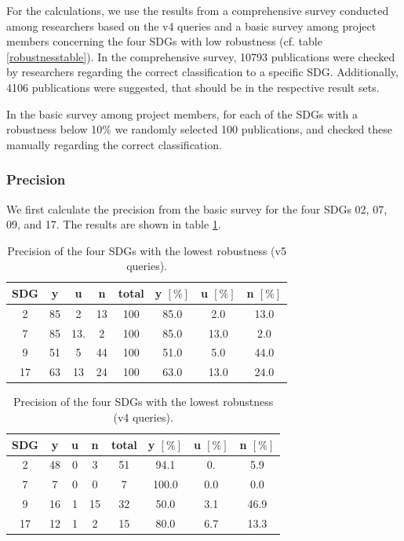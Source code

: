 \documentclass{article}
\begin{document}
For the calculations, we use the results from a comprehensive survey conducted among researchers based on the v4 queries \cite{vanderfeesten_survey_2020} and a basic survey among project members concerning the four SDGs with low robustness (cf. table \ref{robustnesstable}).
In the comprehensive survey, 10793 publications were checked by researchers regarding the correct classification to a specific SDG. Additionally, 4106 publications were suggested, that should be in the respective result sets.

In the basic survey among project members, for each of the SDGs with a robustness below 10\% we randomly selected 100 publications, and checked these manually regarding the correct classification.

\subsubsection{Precision}

We first calculate the precision from the basic survey for the four SDGs 02, 07, 09, and 17. The results are shown in table \ref{precisionv5surv}.

\begin{minipage}[H]{0.49\textwidth}
\begin{table}[H]
\centering 
 \begin{tabular}{cccccccc}
 \toprule
 SDG & y & u & n & total & y $[\%]$ & u $[\%]$ & n $[\%]$ \\
  \hline
2 & 85 & 2 & 13 & 100 & 85.0 & 2.0 & 13.0 \\
7 & 85 & 13. & 2 & 100 & 85.0 & 13.0 & 2.0 \\
9 & 51 & 5 & 44 & 100 & 51.0 & 5.0 & 44.0 \\
17 & 63 & 13 & 24 & 100 & 63.0& 13.0 & 24.0 \\
\bottomrule
\end{tabular}
\caption{Precision of the four SDGs with the lowest robustness (v5 queries).}\label{precisionv5surv}
\end{table}
\end{minipage}
\begin{minipage}[H]{0.01\textwidth}
\hfill
\end{minipage}
\begin{minipage}[H]{0.49\textwidth}
\begin{table}[H]
\centering 
 \begin{tabular}{cccccccc}
 \toprule
  SDG & y & u & n & total & y $[\%]$ & u $[\%]$ & n $[\%]$ \\
  \hline
2& 48 & 0 & 3 & 51 & 94.1 & 0. & 5.9 \\
7 & 7 & 0 & 0 & 7 & 100.0 & 0.0 & 0.0 \\
9 & 16 & 1 & 15 & 32 & 50.0 & 3.1 & 46.9 \\
17 & 12 & 1 & 2 & 15 & 80.0 & 6.7 & 13.3 \\
\bottomrule
\end{tabular}\caption{Precision of the four SDGs with the lowest robustness (v4 queries).}\label{precisionv4surv}
\end{table}
\end{minipage}
\end{document}
